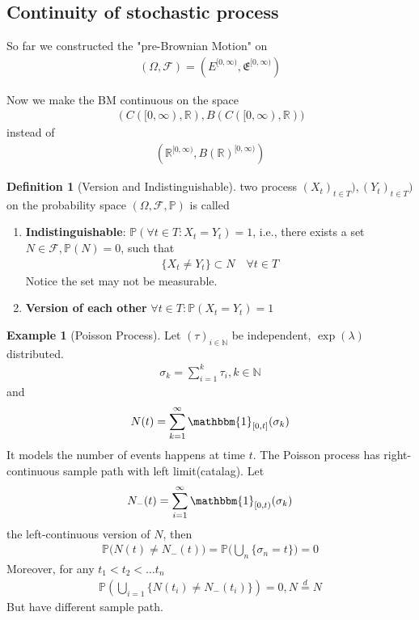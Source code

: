 \documentclass[a4paper,11pt]{book}
\theoremstyle{definition}
\newtheorem{definition}{Definition}[section]
\newtheorem*{example}{Example}
\theoremstyle{remark}
\begin{document}
\subsection{Continuity of stochastic process}
So far we constructed the "pre-Brownian Motion" on 
\begin{align*}
	(\Omega, \mathcal{F}) = (E^{[0, \infty)}, \mathfrak{E}^{[0, \infty)})
\end{align*}

Now we make the BM continuous on the space
\begin{align*}
	(C([0, \infty), \mathbb{R}), B(C([0, \infty), \mathbb{R}))
\end{align*}
instead of 
\begin{align*}
	(\mathbb{R}^{[0, \infty)}, B(\mathbb{R})^{[0, \infty)})
\end{align*}


\begin{definition}[Version and Indistinguishable]
	two process $(X_t)_{t \in T}), (Y_t)_{t \in T})$ on the probability space $(\Omega, \mathcal{F}, \mathbb{P})$ is called
	\begin{enumerate}
		\item \textbf{Indistinguishable}: $\mathbb{P}(\forall t \in T: X_t = Y_t) = 1$, i.e., there exists a set $N \in \mathcal{F}, \mathbb{P}(N) = 0$, such that 
		\begin{align*}
			\{X_t \neq Y_t\} \subset N \quad \forall t \in T
		\end{align*}
		Notice the set may not be measurable.
		\item \textbf{Version of each other} $\forall t \in T: \mathbb{P}(X_t = Y_t) = 1$
	\end{enumerate}
\end{definition}

\begin{example}[Poisson Process]
	Let $(\tau)_{i \in \mathbb{N}}$ be independent, $\exp(\lambda)$ distributed.
	\begin{align*}
		\sigma_k = \sum_{i = 1}^k \tau_i, k \in \mathbb{N}
	\end{align*}
	and 
	\begin{align*}
		N(t) = \sum_{k = 1}^\infty \mathbbm{1}_{[0, t]}(\sigma_k)
	\end{align*}
	It models the number of events happens at time $t$. The Poisson process has right-continuous sample path with left limit(catalag). Let 
	\begin{align*}
		N_-(t) = \sum_{i = 1}^\infty \mathbbm{1}_{[0, t)}(\sigma_k)
	\end{align*}
	the left-continuous version of $N$, then
	\begin{align*}
		\mathbb{P}\bigg(N(t) \neq N_-(t)\bigg) = \mathbb{P}\bigg(\bigcup_n \{\sigma_n = t\}\bigg) = 0
	\end{align*}
	Moreover, for any $t_1 < t_2 < \dots t_n$
	\begin{align*}
		\mathbb{P}(\bigcup_{i = 1}\{N(t_i) \neq N_-(t_i)\}) = 0, N\overset{d}{=} N
	\end{align*}
	But have different sample path.
\end{example}
\end{document}
